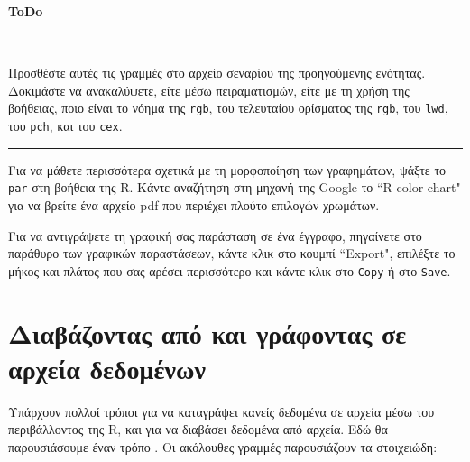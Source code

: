 \documentclass[a4paper,10pt,twocolumn]{article}
\newenvironment{ToDo} {
  \begin{flushright}
    \hfill
    \begin{minipage}{0.9\columnwidth}
    \textsf{\textbf{ToDo}} \\
      \vspace{-0.7cm}\\
      {\color{Gray}\rule[-0.05cm]{\columnwidth}{1.5pt}}} {
      {\color{Gray}\rule[0.3cm]{\columnwidth}{1.5pt}}
    \end{minipage}
    \vspace{0.3cm}
  \end{flushright}
  }
\begin{document}
\begin{ToDo}
  Προσθέστε αυτές τις γραμμές στο αρχείο σεναρίου της προηγούμενης ενότητας. Δοκιμάστε να ανακαλύψετε, είτε 
  μέσω πειραματισμών, είτε με τη χρήση της βοήθειας, ποιο είναι το νόημα της \texttt{rgb}, του τελευταίου
  ορίσματος της \texttt{rgb}, του \texttt{lwd}, του \texttt{pch}, και του \texttt{cex}.\\
\end{ToDo}

Για να μάθετε περισσότερα σχετικά με τη μορφοποίηση των γραφημάτων, ψάξτε το \texttt{par} στη βοήθεια της R.
Κάντε αναζήτηση στη μηχανή της Google το ``R color chart" για να βρείτε ένα αρχείο pdf που περιέχει πλούτο
επιλογών χρωμάτων.

Για να αντιγράψετε τη γραφική σας παράσταση σε ένα έγγραφο, πηγαίνετε στο παράθυρο των γραφικών παραστάσεων,
κάντε κλικ στο κουμπί ``Export", επιλέξτε το μήκος και πλάτος που σας αρέσει περισσότερο και κάντε κλικ στο
\texttt{Copy} ή στο \texttt{Save}. 


\section{Διαβάζοντας από και γράφοντας σε αρχεία δεδομένων}
\label{sec:reading-writing-data}

Υπάρχουν πολλοί τρόποι για να καταγράψει κανείς δεδομένα σε αρχεία μέσω του περιβάλλοντος της R, και για να 
διαβάσει δεδομένα από αρχεία. Εδώ θα παρουσιάσουμε έναν τρόπο . Οι ακόλουθες γραμμές παρουσιάζουν τα στοιχειώδη:
\end{document}
